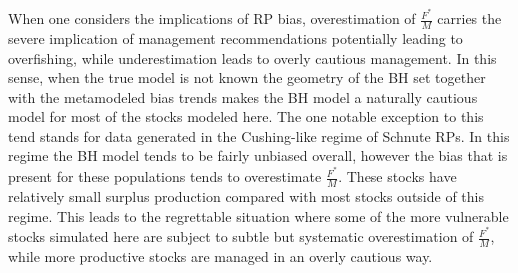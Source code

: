 %
When one considers the implications of RP bias, overestimation of $\frac{F^*}{M}$ carries
the severe implication of management recommendations potentially leading to
overfishing, while underestimation leads to overly cautious management.
In this sense, when the true model is not known the geometry of the BH set together
with the metamodeled bias trends makes the BH model a naturally cautious model
for most of the stocks modeled here.
The one notable exception to this tend stands for data
generated in the Cushing-like regime of Schnute RPs. In this regime the BH
model tends to be fairly unbiased overall, however the bias that is present
for these populations tends to overestimate $\frac{F^*}{M}$. These 
stocks have relatively small surplus production compared with most stocks outside 
of this regime. This leads to the regrettable situation where some of the more 
vulnerable stocks simulated here are subject to subtle but systematic overestimation 
of $\frac{F^*}{M}$, while more productive stocks are managed in an overly cautious way.

%

%

